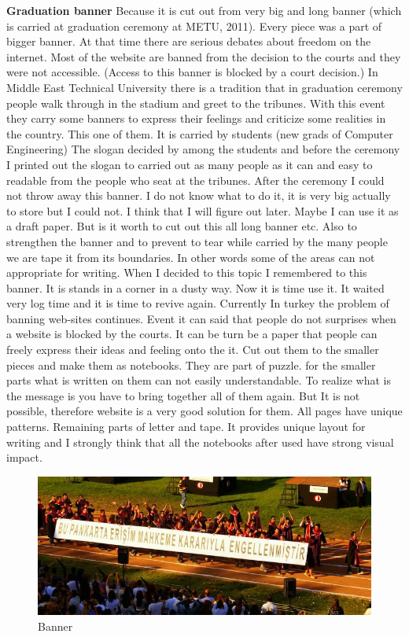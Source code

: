 \textbf{Graduation banner} Because it is cut out from very big and long banner (which is carried at graduation ceremony at METU, 2011). Every piece was a part of bigger banner. At that time there are serious debates about freedom on the internet. Most of the website are banned from the decision to the courts and they were not accessible. (Access to this banner is blocked by a court decision.) In Middle East Technical University there is a tradition that in graduation ceremony people walk through in the stadium and greet to the tribunes. With this event they carry some banners to express their feelings and criticize some realities in the country. This one of them. It is carried by students (new grads of Computer Engineering) The slogan decided by among the students and before the ceremony I printed out the slogan to carried out as many people as it can and easy to readable from the people who seat at the tribunes. After the ceremony I could not throw away this banner. I do not know what to do it, it is very big actually to store but I could not. I think that I will figure out later. Maybe I can use it as a draft paper. But is it worth to cut out this all long banner etc. Also to strengthen the banner and to prevent to tear while carried by the many people we are tape it from its boundaries. In other words some of the areas can not appropriate for writing. When I decided to this topic I remembered to this banner. It is stands in a corner in a dusty way. Now it is time use it. It waited very log time and it is time to revive again. Currently In turkey the problem of banning web-sites continues. Event it can said that people do not surprises when a website is blocked by the courts. It can be turn be a paper that people can freely express their ideas and feeling onto the it. Cut out them to the smaller pieces and make them as notebooks. They are part of puzzle. for the smaller parts what is written on them can not easily understandable. To realize what is the message is you have to bring together all of them again. But It is not possible, therefore website is a very good solution for them. All pages have unique patterns. Remaining parts of letter and tape. It provides unique layout for writing and I strongly think that all the notebooks after used have strong visual impact.

\begin{figure}[h!]
  \centering
  \includegraphics[width=1\textwidth]{project_graphics/banner1.jpg}
  \caption{Banner}
  \label{fig:Banner_1}
\end{figure}

